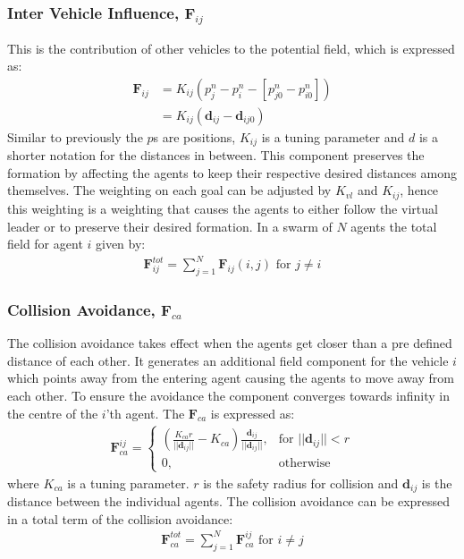 \documentclass[a4paper,conference]{IEEEtran}
\begin{document}
\subsubsection{Inter Vehicle Influence, $\mathbf{F}_{ij}$}
This is the contribution of other vehicles to the potential field,
which is expressed as:
\begin{align}
\mathbf{F}_{ij} &= K_{ij}(p_{j}^n-p_i^n-[p_{j0}^n-p_{i0}^n])\\
&= K_{ij}(\mathbf{d}_{ij}-\mathbf{d}_{ij0})
\end{align}
Similar to previously the $p$s are positions, $K_{ij}$ is a tuning
parameter and $d$ is a shorter notation for the distances in between.
This component preserves the formation by affecting the agents to keep
their respective desired distances among themselves. The weighting on
each goal can be adjusted by $K_{vl}$ and $K_{ij}$, hence this
weighting is a weighting that causes the agents to either follow the
virtual leader or to preserve their desired formation.  In a swarm of
$N$ agents the total field for agent $i$ given by:
\begin{align}
\mathbf{F}_{ij}^{tot} = \sum\limits_{j=1}^N\mathbf{F}_{ij}(i,j) \text{ for } j\neq i
\end{align}

\subsubsection{Collision Avoidance, $\mathbf{F}_{ca}$}
The collision avoidance takes effect when the agents get closer than a
pre defined distance of each other. It generates an additional field
component for the vehicle $i$ which points away from the entering
agent causing the agents to move away from each other. To ensure the
avoidance the component converges towards infinity in the centre of
the $i$'th agent. The $\mathbf{F}_{ca}$ is expressed as:
\begin{align}
    \mathbf{F}_{ca}^{ij}= 
\begin{cases}
		\left(
    \frac{K_{ca}r}{||\mathbf{d}_{ij}||}-K_{ca}
		\right)
		\frac{\mathbf{d}_{ij}}{||\mathbf{d}_{ij}||}
		,& \text{for } ||\mathbf{d}_{ij}||<r\\
    0,              & \text{otherwise}
\end{cases}
\end{align}
where $K_{ca}$ is a tuning parameter. $r$ is the safety radius for
collision and $\mathbf{d}_{ij}$ is the distance between the individual agents.
The collision avoidance can be expressed in a total term of the
collision avoidance:
\begin{align}
\mathbf{F}_{ca}^{tot} = \sum\limits_{j=1}^N\mathbf{F}_{ca}^{ij} \text{ for } i\neq j
\end{align}
\end{document}
